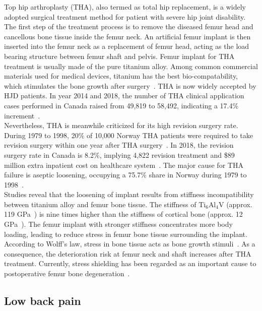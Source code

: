 \documentclass[12pt]{extbook}
\begin{document}
Top hip arthroplasty (THA), also termed as total hip replacement, is a widely adopted surgical treatment method for patient with severe hip joint disability. The first step of the treatment process is to remove the diseased femur head and cancellous bone tissue inside the femur neck. An artificial femur implant is then inserted into the femur neck as a replacement of femur head, acting as the load bearing structure between femur shaft and pelvis. Femur implant for THA treatment is usually made of the pure titanium alloy. Among common commercial materials used for medical devices, titanium has the best bio-compatability, which stimulates the bone growth after surgery~\cite{olivares2015implant}. THA is now widely accepted by HJD patients. In year 2014 and 2018, the number of THA clinical application cases performed in Canada raised from 49,819 to 58,492, indicating a 17.4\% increment~\cite{canadian2019hip}.\\

Nevertheless, THA is meanwhile criticized for its high revision surgery rate. During 1979 to 1998, 20\% of 10,000 Norway THA patients were required to take revision surgery within one year after THA surgery~\cite{malchau2000update}. In 2018, the revision surgery rate in Canada is 8.2\%, implying 4,822 revision treatment and \$89 million extra inpatient cost on healthcare system~\cite{canadian2019hip}. The major cause for THA failure is aseptic loosening, occupying a 75.7\% share in Norway during 1979 to 1998~\cite{malchau2000update}.\\

Studies reveal that the loosening of implant results from stiffness incompatibility between titanium alloy and femur bone tissue. The stiffness of Ti$_6$Al$_4$V (approx. 119 GPa~\cite{bandyopadhyay2010influence}) is nine times higher than the stiffness of cortical bone (approx. 12 GPa~\cite{wirtz2000critical}). The femur implant with stronger stiffness concentrates more body loading, leading to reduce stress in femur bone tissue surrounding the implant. According to Wolff's law, stress in bone tissue acts as bone growth stimuli~\cite{wolff1893gesetz}. As a consequence, the deterioration risk at femur neck and shaft increases after THA treatment. Currently, stress shielding has been regarded as an important cause to postoperative femur bone degeneration~\cite{head1995titanium}.\\

\subsection{Low back pain}
\end{document}
